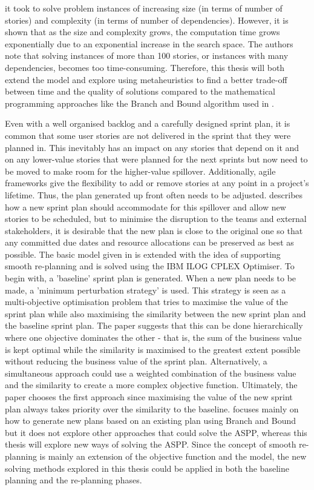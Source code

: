 it took to solve problem instances of increasing size (in terms of number of stories) and complexity (in terms of number of dependencies). However, it is shown that as the size and complexity grows, the computation time grows exponentially due to an exponential increase in the search space. The authors note that solving instances of more than 100 stories, or instances with many dependencies, becomes too time-consuming. Therefore, this thesis will both extend the model and explore using metaheuristics to find a better trade-off between time and the quality of solutions compared to the mathematical programming approaches like the Branch and Bound algorithm used in \citet{golfarelli2012sprint}.

Even with a well organised backlog and a carefully designed sprint plan, it is common that some user stories are not delivered in the sprint that they were planned in. This inevitably has an impact on any stories that depend on it and on any lower-value stories that were planned for the next sprints but now need to be moved to make room for the higher-value spillover. Additionally, agile frameworks give the flexibility to add or remove stories at any point in a project's lifetime. Thus, the plan generated up front often needs to be adjusted. \citet{golfarelli2013multi} describes how a new sprint plan should accommodate for this spillover and allow new stories to be scheduled, but to minimise the disruption to the teams and external stakeholders, it is desirable that the new plan is close to the original one so that any committed due dates and resource allocations can be preserved as best as possible. The basic model given in \citet{golfarelli2012sprint} is extended with the idea of supporting smooth re-planning and is solved using the IBM ILOG CPLEX Optimiser. To begin with, a 'baseline' sprint plan is generated. When a new plan needs to be made, a 'minimum perturbation strategy' is used. This strategy is seen as a multi-objective optimisation problem that tries to maximise the value of the sprint plan while also maximising the similarity between the new sprint plan and the baseline sprint plan. The paper suggests that this can be done hierarchically where one objective dominates the other - that is, the sum of the business value is kept optimal while the similarity is maximised to the greatest extent possible without reducing the business value of the sprint plan. Alternatively, a simultaneous approach could use a weighted combination of the business value and the similarity to create a more complex objective function. Ultimately, the paper chooses the first approach since maximising the value of the new sprint plan always takes priority over the similarity to the baseline. \citet{golfarelli2013multi} focuses mainly on how to generate new plans based on an existing plan using Branch and Bound but it does not explore other approaches that could solve the ASPP, whereas this thesis will explore new ways of solving the ASPP. Since the concept of smooth re-planning is mainly an extension of the objective function and the model, the new solving methods explored in this thesis could be applied in both the baseline planning and the re-planning phases.

